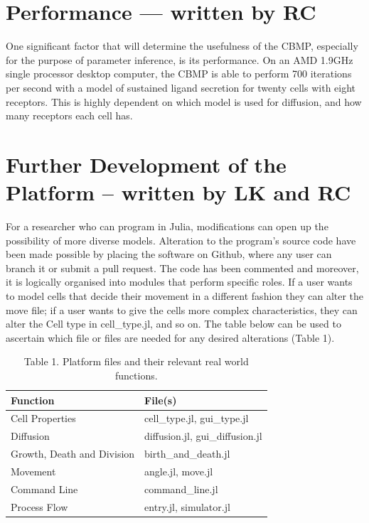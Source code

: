 \documentclass[12pt]{article}
\begin{document}
\section{Performance --- written by RC}
One significant factor that will determine the usefulness of the CBMP, 
especially for the purpose of parameter inference, is its performance. 
On an AMD 1.9GHz single processor desktop computer, the CBMP is able to 
perform 700 iterations per second with a model of sustained ligand 
secretion for twenty cells with eight receptors. This is highly 
dependent on which model is used for diffusion, and how many receptors 
each cell has.

\section{Further Development of the Platform -- written by LK and RC}
For a researcher who can program in Julia, modifications can open up the 
possibility of more diverse models. Alteration to the program's source 
code have been made possible by placing the software on Github, where 
any user can branch it or submit a pull request. The code has been 
commented and moreover, it is logically organised into modules that 
perform specific roles. If a user wants to model cells that decide their 
movement in a different fashion they can alter the move file; if a user 
wants to give the cells more complex characteristics, they can alter the 
Cell type in cell\_type.jl, and so on. The table below can be used to 
ascertain which file or files are needed for any desired alterations 
(Table 1).

\begin{table}[H]
\centering
\begin{tabular}{ll}
\hline
{\bfseries Function} & {\bfseries File(s)} \\
\hline
Cell Properties & cell\_type.jl, gui\_type.jl \\
Diffusion & diffusion.jl, gui\_diffusion.jl \\
Growth, Death and Division & birth\_and\_death.jl \\
Movement & angle.jl, move.jl \\
Command Line & command\_line.jl \\
Process Flow & entry.jl, simulator.jl \\
\hline
\end{tabular}
\caption{Table 1. Platform files and their relevant real world 
functions.}
\end{table}
\end{document}
